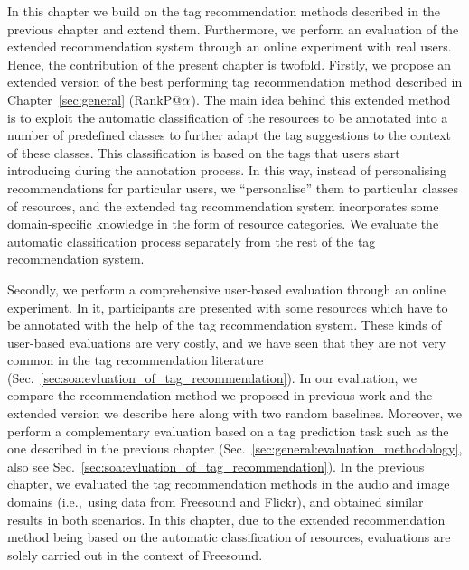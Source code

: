 In this chapter we build on the tag recommendation methods described in the previous chapter and extend them. Furthermore, we perform an evaluation of the extended recommendation system through an online experiment with real users. Hence, the contribution of the present chapter is twofold. 
Firstly, we propose an extended version of the best performing tag recommendation method described in Chapter~\ref{sec:general} (RankP@$\alpha$). The main idea behind this extended method is to exploit the automatic classification of the resources to be annotated into a number of predefined classes to further adapt the tag suggestions to the context of these classes. This classification is based on the tags that users start introducing during the annotation process. In this way, instead of personalising recommendations for particular users, we ``personalise'' them to particular classes of resources, and the extended tag recommendation system incorporates some domain-specific knowledge in the form of resource categories.
We evaluate the automatic classification process separately from the rest of the tag recommendation system.

Secondly, we perform a comprehensive user-based evaluation through an online experiment. In it, participants are presented with some resources which have to be annotated with the help of the tag recommendation system. 
These kinds of user-based evaluations are very costly, and we have seen that they are not very common in the tag recommendation literature (Sec.~\ref{sec:soa:evluation_of_tag_recommendation}). In our evaluation, we compare the recommendation method we proposed in previous work and the extended version we describe here along with two random baselines. Moreover, we perform a complementary evaluation based on a tag prediction task such as the one described in the previous chapter (Sec.~\ref{sec:general:evaluation_methodology}, also see Sec.~\ref{sec:soa:evluation_of_tag_recommendation}). 
In the previous chapter, we evaluated the tag recommendation methods in the audio and image domains (i.e.,~using data from Freesound and Flickr), and obtained similar results in both scenarios. In this chapter, due to the extended recommendation method being based on the automatic classification of resources, evaluations are solely carried out in the context of Freesound. 

